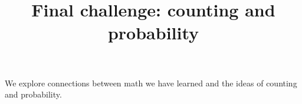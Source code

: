 \documentclass{ximera}
\title{Final challenge: counting and probability}
\begin{document}
\begin{abstract}
\end{abstract}
\maketitle

We explore connections between math we have learned and the ideas of counting and probability.
\end{document}

